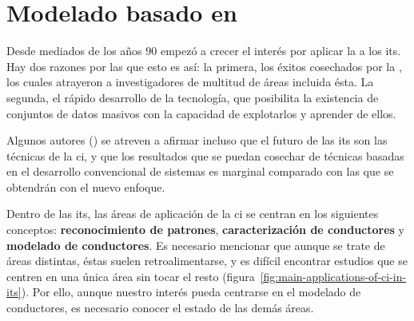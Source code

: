 \section{Modelado basado en }

Desde mediados de los años $90$ empezó a crecer el interés por aplicar la  a los \gls{its}. Hay dos razones por las que esto es así: la primera, los éxitos cosechados por la , los cuales atrayeron a investigadores de multitud de áreas incluida ésta. La segunda, el rápido desarrollo de la tecnología, que posibilita la existencia de conjuntos de datos masivos con la capacidad de explotarlos y aprender de ellos.

Algunos autores (\cite{Zhang2011}) se atreven a afirmar incluso que el futuro de las \gls{its} son las técnicas de la \gls{ci}, y que los resultados que se puedan cosechar de técnicas basadas en el desarrollo convencional de sistemas es marginal comparado con las que se obtendrán con el nuevo enfoque.

Dentro de las \gls{its}, las áreas de aplicación de la \gls{ci} se centran en los siguientes conceptos: \textbf{reconocimiento de patrones}, \textbf{caracterización de conductores} y \textbf{modelado de conductores}. Es necesario mencionar que aunque se trate de áreas distintas, éstas suelen retroalimentarse, y es difícil encontrar estudios que se centren en una única área sin tocar el resto (figura~\ref{fig:main-applications-of-ci-in-its}). Por ello, aunque nuestro interés pueda centrarse en el modelado de conductores, es necesario conocer el estado de las demás áreas.

